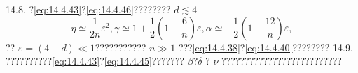 14.8. ?\autoref{eq:14.4.43}?\autoref{eq:14.4.46}???????? \(d \lesssim 4\)
\begin{equation}\tag{14.4.120}\label{eq:14.4.120}
\eta \simeq \frac { 1 } { 2 n } \varepsilon ^{2} ,  \gamma \simeq 1 + \frac { 1 } { 2 } \left( 1 - \frac { 6 } { n } \right) \varepsilon ,  \alpha \simeq - \frac { 1 } { 2 } \left( 1 - \frac { 12 } { n } \right) \varepsilon ,
\end{equation}
?? \(\varepsilon=(4-d)\ll1\)??????????? \(n\gg1\) ???\autoref{eq:14.4.38}?\autoref{eq:14.4.40}????????
14.9. ??????????\autoref{eq:14.4.43}?\autoref{eq:14.4.45}??????? \(\beta\)?\(\delta\) ? \(\nu\) ??????????????????????????



